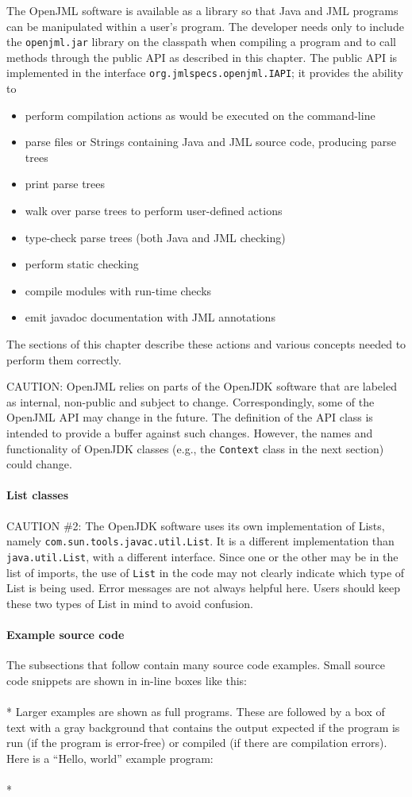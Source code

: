 \documentclass{report}%
\newcommand{\boxspace}{\vspace*{6pt}}
\newcommand{\boxedexample}[1]{\boxspace \\ \fbox{\parbox{5.50in}{\tt #1}}\boxspace\\*}
\newcommand{\boxedinputc}[2]{\boxspace \\ \fbox{\parbox{6.00in}{\tt }} \fcolorbox{black}{gray}{\parbox{6.00in}{\tt }} \boxspace\\*}
\newcommand{\source}{../demos}
\newcommand{\demo}[1]{\boxedinputc{\source/#1.java}{\source/#1.txt}}
\begin{document}
The OpenJML software is available as a library so that Java and JML programs can be manipulated 
within a user's program. The developer needs only to include the {\tt openjml.jar} library on 
the classpath when compiling a program and to call methods through the public API as described in this chapter.
The public API is implemented in the interface {\tt org.jmlspecs.openjml.IAPI}; it provides the ability to
\begin{itemize}
\item perform compilation actions as would be executed on the command-line
\item parse files or Strings containing Java and JML source code, producing parse trees
\item print parse trees
\item walk over parse trees to perform user-defined actions
\item type-check parse trees (both Java and JML checking)
\item perform static checking
\item compile modules with run-time checks
\item emit javadoc documentation with JML annotations
\end{itemize}
The sections of this chapter describe these actions and various concepts needed to perform them correctly.

CAUTION: OpenJML relies on parts of the OpenJDK software that are labeled as internal, non-public and subject to
change. Correspondingly, some of the OpenJML API may change in the future. The definition of the API class is 
intended to provide a buffer against such changes. However, the names and functionality of OpenJDK classes (e.g.,
the {\tt Context} class in the next section) could change.

\paragraph{List classes}
CAUTION \#2: The OpenJDK software uses its own implementation of Lists, namely {\tt com.sun.tools.javac.util.List}. 
It is a different implementation than {\tt java.util.List}, with a different interface. Since one or the other may
 be in the list of imports, the use of {\tt List} in the code may not clearly indicate which type of List is being
 used. Error messages are not always helpful here. Users should keep these two types of List in mind to avoid 
 confusion.

\paragraph{Example source code}
The subsections that follow contain many source code examples. 
Small source code snippets are shown in in-line boxes like this:
\boxedexample{ // A Java comment }
Larger examples are shown as full programs. These are followed by a box of text with a gray background that contains the output expected if the program is run (if the program is error-free) or compiled (if there are compilation errors).
Here is a ``Hello, world'' example program:
\demo{DemoHelloWorld}
\end{document}
